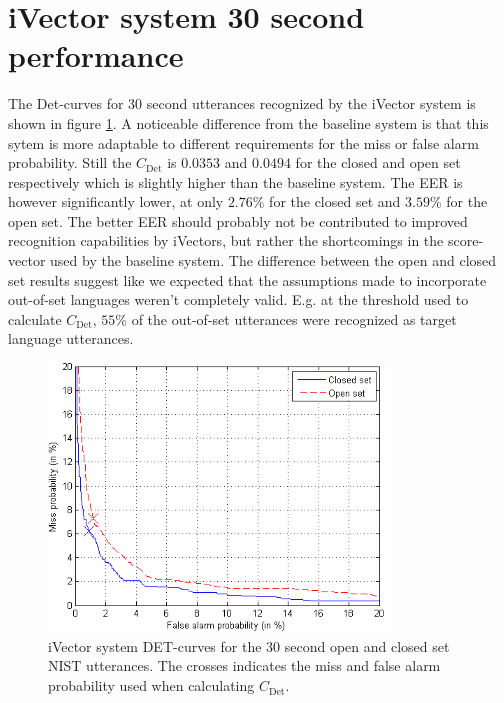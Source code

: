 
\section{iVector system 30 second performance}

The Det-curves for 30 second utterances recognized by the iVector system is shown in figure \ref{fig:ivectdet30}. A noticeable difference from the baseline system is that this sytem is more adaptable to different requirements for the miss or false alarm probability. Still the $C_{\text{Det}}$ is $0.0353$ and $0.0494$ for the closed and open set respectively which is slightly higher than the baseline system. The EER is however significantly lower, at only $2.76$\% for the closed set and $3.59$\% for the open set. The better EER should probably not be contributed to improved recognition capabilities by iVectors, but rather the shortcomings in the score-vector used by the baseline system. The difference between the open and closed set results suggest like we expected that the assumptions made to incorporate out-of-set languages weren't completely valid. E.g. at the threshold used to calculate $C_{\text{Det}}$, $55$\% of the out-of-set utterances were recognized as target language utterances. 

\begin{figure}[hbt!]
\begin{center}
	\includegraphics[width=0.8\textwidth]{figures/ivectDet30.png}
\end{center}
\caption{iVector system DET-curves for the 30 second open and closed set NIST utterances. The crosses indicates the miss and false alarm probability used when calculating $C_{\text{Det}}$.}
\label{fig:ivectdet30}
\end{figure}

